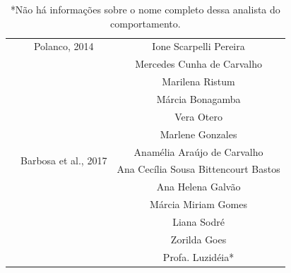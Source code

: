\begin{table}[tbp]
\begin{adjustbox}{max width=1\textwidth}
\begin{tabular}{@{}ccc@{}}
\multicolumn{1}{c|}{}                                                      & \multicolumn{1}{c|}{Polanco, 2014}                            & Ione Scarpelli Pereira                      \\ \cmidrule(l){2-3} 
\multicolumn{1}{c|}{}                                                      & \multicolumn{1}{c|}{\multirow{12}{*}{Barbosa et al., 2017}}   & Mercedes Cunha de Carvalho                  \\
\multicolumn{1}{c|}{}                                                      & \multicolumn{1}{c|}{}                                         & Marilena Ristum                             \\
\multicolumn{1}{c|}{}                                                      & \multicolumn{1}{c|}{}                                         & Márcia Bonagamba                            \\
\multicolumn{1}{c|}{}                                                      & \multicolumn{1}{c|}{}                                         & Vera Otero                                  \\
\multicolumn{1}{c|}{}                                                      & \multicolumn{1}{c|}{}                                         & Marlene Gonzales                            \\
\multicolumn{1}{c|}{}                                                      & \multicolumn{1}{c|}{}                                         & Anamélia Araújo de Carvalho                 \\
\multicolumn{1}{c|}{}                                                      & \multicolumn{1}{c|}{}                                         & Ana Cecília Sousa Bittencourt Bastos        \\
\multicolumn{1}{c|}{}                                                      & \multicolumn{1}{c|}{}                                         & Ana Helena Galvão                           \\
\multicolumn{1}{c|}{}                                                      & \multicolumn{1}{c|}{}                                         & Márcia Miriam Gomes                         \\
\multicolumn{1}{c|}{}                                                      & \multicolumn{1}{c|}{}                                         & Liana Sodré                                 \\
\multicolumn{1}{c|}{}                                                      & \multicolumn{1}{c|}{}                                         & Zorilda Goes                                \\
\multicolumn{1}{c|}{}                                                      & \multicolumn{1}{c|}{}                                         & Profa. Luzidéia*                           
\end{tabular}
\end{adjustbox}
\caption*{*Não há informações sobre o nome completo dessa analista do comportamento.}
\end{table}

